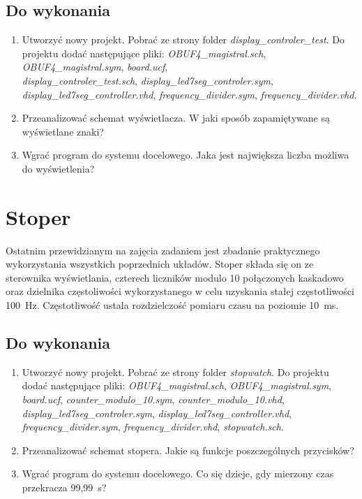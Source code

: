 \documentclass[12pt]{article}
\begin{document}
\subsection{Do wykonania}
\begin{enumerate}[wide, labelwidth=!, labelindent=0pt]	
\item Utworzyć nowy projekt. Pobrać ze strony folder \textit{display\_controler\_test}. Do projektu dodać następujące pliki: \textit{OBUF4\_magistral.sch}, \textit{OBUF4\_magistral.sym}, \textit{board.ucf},\\ \textit{display\_controler\_test.sch}, \textit{display\_led7seg\_controler.sym}, \textit{display\_led7seg\_controller.vhd}, \textit{frequency\_divider.sym}, \textit{frequency\_divider.vhd}.
\item Przeanalizować schemat wyświetlacza. W jaki sposób zapamiętywane są wyświetlane znaki?
\item Wgrać program do systemu docelowego. Jaka jest największa liczba możliwa do wyświetlenia?
\end{enumerate}
\section{Stoper}
Ostatnim przewidzianym na zajęcia zadaniem jest zbadanie praktycznego wykorzystania wszystkich poprzednich układów. Stoper składa się on ze sterownika wyświetlania, czterech liczników modulo 10 połączonych kaskadowo oraz dzielnika częstoliwości wykorzystanego w celu uzyskania stałej częstotliwości 100~Hz. Częstotliwość ustala rozdzielczość pomiaru czasu na poziomie 10~ms. 
\subsection{Do wykonania}
\begin{enumerate}[wide, labelwidth=!, labelindent=0pt]	
\item Utworzyć nowy projekt. Pobrać ze strony folder \textit{stopwatch}. Do projektu dodać następujące pliki: \textit{OBUF4\_magistral.sch}, \textit{OBUF4\_magistral.sym}, \textit{board.ucf}, \textit{counter\_modulo\_10.sym}, \textit{counter\_modulo\_10.vhd}, \textit{display\_led7seg\_controler.sym}, \textit{display\_led7seg\_controller.vhd},\\ \textit{frequency\_divider.sym}, \textit{frequency\_divider.vhd}, \textit{stopwatch.sch}.
\item Przeanalizować schemat stopera. Jakie są funkcje poszczególnych przycisków?
\item Wgrać program do systemu docelowego. Co się dzieje, gdy mierzony czas przekracza 99,99~s?
\end{enumerate}
\end{document}
